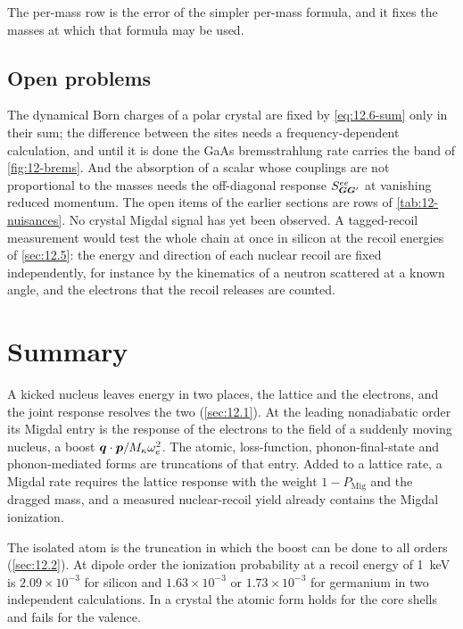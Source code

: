 The per-mass row is the error of the simpler per-mass formula, and it fixes the masses at which that formula may be used.

\subsection{Open problems}\label{sec:12.6-open}

The dynamical Born charges of a polar crystal are fixed by \cref{eq:12.6-sum} only in their sum; the difference between the sites needs a frequency-dependent calculation, and until it is done the GaAs bremsstrahlung rate carries the band of \cref{fig:12-brems}. And the absorption of a scalar whose couplings are not proportional to the masses needs the off-diagonal response $S^{ee}_{\bm{G}\bm{G}'}$ at vanishing reduced momentum. The open items of the earlier sections are rows of \cref{tab:12-nuisances}. No crystal Migdal signal has yet been observed. A tagged-recoil measurement would test the whole chain at once in silicon at the recoil energies of \cref{sec:12.5}: the energy and direction of each nuclear recoil are fixed independently, for instance by the kinematics of a neutron scattered at a known angle, and the electrons that the recoil releases are counted.

\section*{Summary}

A kicked nucleus leaves energy in two places, the lattice and the electrons, and the joint response resolves the two (\cref{sec:12.1}). At the leading nonadiabatic order its Migdal entry is the response of the electrons to the field of a suddenly moving nucleus, a boost $\bm{q}\cdot\bm{p}/M_\kappa\omega_e^2$. The atomic, loss-function, phonon-final-state and phonon-mediated forms are truncations of that entry. Added to a lattice rate, a Migdal rate requires the lattice response with the weight $1 - P_{\mathrm{Mig}}$ and the dragged mass, and a measured nuclear-recoil yield already contains the Migdal ionization.

The isolated atom is the truncation in which the boost can be done to all orders (\cref{sec:12.2}). At dipole order the ionization probability at a recoil energy of \SI{1}{keV} is $2.09\times10^{-3}$ for silicon and $1.63\times10^{-3}$ or $1.73\times10^{-3}$ for germanium in two independent calculations. In a crystal the atomic form holds for the core shells and fails for the valence.

